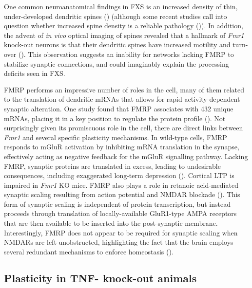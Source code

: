 One common neuroanatomical findings in FXS is an increased density of thin, under-developed dendritic spines (\cite{Hinton1991, Comery1997, Dolen2007, Liu2011}) (although some recent studies call into question whether increased spine density is a reliable pathology (\cite{Cruz-Martin2010, Harlow2010, Meredith2007})). In addition, the advent of \textit{in vivo} optical imaging of spines revealed that a hallmark of \textit{Fmr1} knock-out neurons is that their dendritic spines have increased motility and turn-over (\cite{Cruz-Martin2010, Pan2010}). This observation suggests an inability for networks lacking FMRP to stabilize synaptic connections, and could imaginably explain the processing deficits seen in FXS.

FMRP performs an impressive number of roles in the cell, many of them related to the translation of dendritic mRNAs that allows for rapid activity-dependent synaptic alteration. One study found that FMRP associates with 432 unique mRNAs, placing it in a key position to regulate the protein profile (\cite{Brown2001}). Not surprisingly given its promiscuous role in the cell, there are direct links between \textit{Fmr1} and several specific plasticity mechanisms. In wild-type cells, FMRP responds to mGluR activation by inhibiting mRNA translation in the synapse, effectively acting as negative feedback for the mGluR signalling pathway. Lacking FMRP, synaptic proteins are translated in excess, leading to undesirable consequences, including exaggerated long-term depression (\cite{Huber2002, Bear2004}). Cortical LTP is impaired in \textit{Fmr1} KO mice. FMRP also plays a role in retanoic acid-mediated synaptic scaling resulting from action potential and NMDAR blockade (\cite{Soden2010}). This form of synaptic scaling is independent of protein transcription, but instead proceeds through translation of locally-available GluR1-type AMPA receptors that are then available to be inserted into the post-synaptic membrane. Interestingly, FMRP does not appear to be required for synaptic scaling when NMDARs are left unobstructed, highlighting the fact that the brain employs several redundant mechanisms to enforce homeostasis (\cite{Soden2010}).

\subsection{Plasticity in TNF-\textalpha{} knock-out animals}

